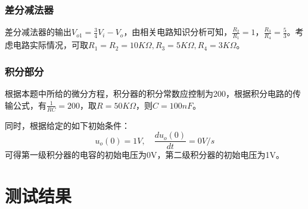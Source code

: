 \documentclass[a4paper]{article}
\theoremstyle{definition}
\theoremstyle{plain}
\theoremstyle{remark}
\begin{document}
\subsubsection{差分减法器}
差分减法器的输出$V_{o1}=\frac{3}{4}V_i-V_o$，由相关电路知识分析可知，$\frac{R_2}{R_1}=1$，$\frac{R_3}{R_4}=\frac{5}{3}$。考虑电路实际情况，可取$R_1=R_2=10K\Omega,R_3=5K\Omega,R_4=3K\Omega$。

\subsubsection{积分部分}
根据本题中所给的微分方程，积分器的积分常数应控制为200，根据积分电路的传输公式，有$\frac{1}{RC}=200$，取$R=50K\Omega$，则$C=100nF$。

同时，根据给定的如下初始条件：
$$
	u_o(0)=1V, \hspace{1em} \frac{du_o(0)}{dt}=0V/s
$$
可得第一级积分器的电容的初始电压为0V，第二级积分器的初始电压为1V。

\section{测试结果}
\end{document}
